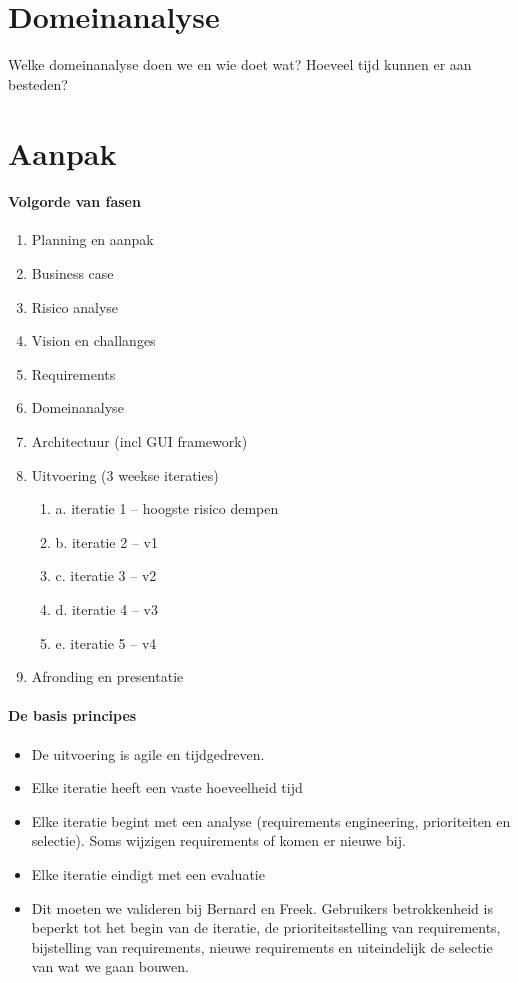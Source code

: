 \documentclass[a4paper,11pt,twoside,draft]{article}
\begin{document}
\section{Domeinanalyse}

Welke domeinanalyse doen we en wie doet wat? Hoeveel tijd kunnen er aan besteden?

\section{Aanpak}

\paragraph{Volgorde van fasen}

\begin{enumerate}
 \item Planning en aanpak
 \item Business case
 \item Risico analyse
 \item Vision en challanges
 \item Requirements
 \item Domeinanalyse
 \item Architectuur (incl GUI framework)
 \item Uitvoering (3 weekse iteraties)
 \begin{enumerate}
  \item a. iteratie 1 -- hoogste risico dempen
  \item b. iteratie 2 -- v1
  \item c. iteratie 3 -- v2
  \item d. iteratie 4 -- v3
  \item e. iteratie 5 -- v4
 \end{enumerate}
\item Afronding en presentatie
\end{enumerate}

\paragraph{De basis principes}
\begin{itemize}
 \item De uitvoering is agile en tijdgedreven.
 \item Elke iteratie heeft een vaste hoeveelheid tijd
 \item Elke iteratie begint met een analyse (requirements engineering, prioriteiten en selectie). Soms wijzigen requirements of komen er nieuwe bij.
 \item Elke iteratie eindigt met een evaluatie
 \item Dit moeten we valideren bij Bernard en Freek. Gebruikers betrokkenheid is
 beperkt tot het begin van de iteratie, de prioriteitsstelling van requirements, bijstelling van
 requirements, nieuwe requirements en uiteindelijk de selectie van wat we gaan bouwen.
\end{itemize}
\end{document}

